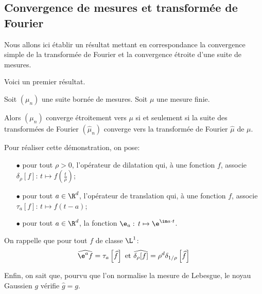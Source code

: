 \subsection{Convergence de mesures et transformée de Fourier}

Nous allons ici établir un résultat mettant en correspondance la convergence simple de la transformée de Fourier et la convergence étroite d'une suite de mesures.

Voici un premier résultat.

\begin{prop}
Soit $(\mu_n)$ une suite bornée de mesures. Soit $\mu$ une mesure finie.

\medskip
Alors $(\mu_n)$ converge étroitement vers $\mu$ si et seulement si la suite des transformées de Fourier $\left (\widehat{\mu}_n\right )$ converge vers la transformée de Fourier $\widehat{\mu}$ de $\mu$.
\end{prop}

Pour réaliser cette démonstration, on pose:
\begin{itemize}
\item[$\bullet$] 
pour tout $\rho>0$, l'opérateur de dilatation qui, à une fonction $f$, associe $\delta_\rho[f]: \, t \mapsto f\left ( \frac{t}{\rho}\right )$;
\item[$\bullet$] 
pour tout $a \in \R^d$, l'opérateur de translation qui,  à une fonction $f$, associe $\tau_a[f]: \, t \mapsto f\left ( t-a\right )$;
\item[$\bullet$] 
pour tout $a \in \R^d$, la fonction $\e_a: \, t \mapsto \e^{\im a \cdot t}$.
\end{itemize}

On rappelle que pour tout $f$ de classe $\L^1$:
\[
\widehat{\e^a f} = \tau_a\left [\widehat{f}\right ] \text{ et }\widehat{\delta_{\rho} [f]} = \rho^d \delta_{1/\rho}\left [ \widehat{f}\right ]
\]

Enfin, on sait que, pourvu que l'on normalise la mesure de Lebesgue, le noyau Gaussien $g$ vérifie $\widehat{g} = g$.


